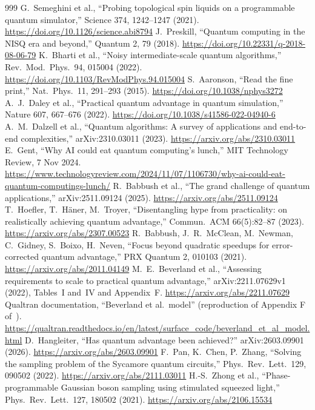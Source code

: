 \begin{thebibliography}{999}
 G.~Semeghini et al., ``Probing topological spin liquids on a programmable quantum simulator,'' Science 374, 1242--1247 (2021). \url{https://doi.org/10.1126/science.abi8794}
 J.~Preskill, ``Quantum computing in the NISQ era and beyond,'' Quantum 2, 79 (2018). \url{https://doi.org/10.22331/q-2018-08-06-79}
 K.~Bharti et al., ``Noisy intermediate-scale quantum algorithms,'' Rev.\ Mod.\ Phys.\ 94, 015004 (2022). \url{https://doi.org/10.1103/RevModPhys.94.015004}
 S.~Aaronson, ``Read the fine print,'' Nat.\ Phys.\ 11, 291--293 (2015). \url{https://doi.org/10.1038/nphys3272}
 A.~J.~Daley et al., ``Practical quantum advantage in quantum simulation,'' Nature 607, 667--676 (2022). \url{https://doi.org/10.1038/s41586-022-04940-6}
 A.~M.~Dalzell et al., ``Quantum algorithms: A survey of applications and end-to-end complexities,'' arXiv:2310.03011 (2023). \url{https://arxiv.org/abs/2310.03011}
 E.~Gent, ``Why AI could eat quantum computing's lunch,'' MIT Technology Review, 7 Nov 2024. \url{https://www.technologyreview.com/2024/11/07/1106730/why-ai-could-eat-quantum-computings-lunch/}
 R.~Babbush et al., ``The grand challenge of quantum applications,'' arXiv:2511.09124 (2025). \url{https://arxiv.org/abs/2511.09124}
 T.~Hoefler, T.~H\"aner, M.~Troyer, ``Disentangling hype from practicality: on realistically achieving quantum advantage,'' Commun.\ ACM 66(5):82--87 (2023). \url{https://arxiv.org/abs/2307.00523}
 R.~Babbush, J.~R.~McClean, M.~Newman, C.~Gidney, S.~Boixo, H.~Neven, ``Focus beyond quadratic speedups for error-corrected quantum advantage,'' PRX Quantum 2, 010103 (2021). \url{https://arxiv.org/abs/2011.04149}
 M.~E.~Beverland et al., ``Assessing requirements to scale to practical quantum advantage,'' arXiv:2211.07629v1 (2022), Tables~I and~IV and Appendix~F. \url{https://arxiv.org/abs/2211.07629}
 Qualtran documentation, ``Beverland et al.\ model'' (reproduction of Appendix F of~\cite{beverland2022}). \url{https://qualtran.readthedocs.io/en/latest/surface_code/beverland_et_al_model.html}
 D.~Hangleiter, ``Has quantum advantage been achieved?'' arXiv:2603.09901 (2026). \url{https://arxiv.org/abs/2603.09901}
 F.~Pan, K.~Chen, P.~Zhang, ``Solving the sampling problem of the Sycamore quantum circuits,'' Phys.\ Rev.\ Lett.\ 129, 090502 (2022). \url{https://arxiv.org/abs/2111.03011}
 H.-S.~Zhong et al., ``Phase-programmable Gaussian boson sampling using stimulated squeezed light,'' Phys.\ Rev.\ Lett.\ 127, 180502 (2021). \url{https://arxiv.org/abs/2106.15534}


\end{thebibliography}
